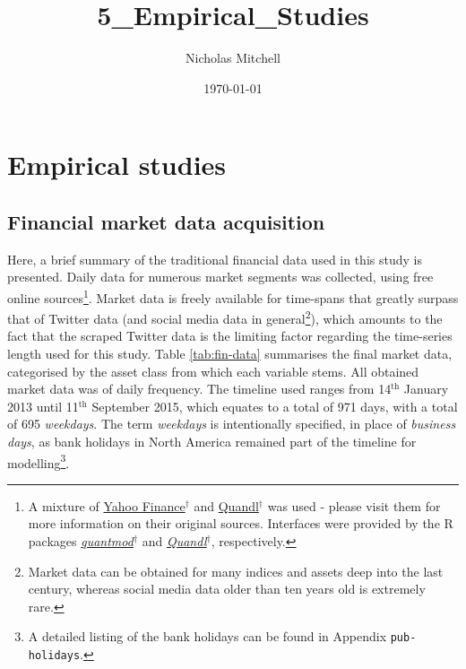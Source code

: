 \documentclass{article}
\author{Nicholas Mitchell}
\date{\today}
\title{5\_Empirical\_Studies}
\begin{document}
\maketitle
\tableofcontents

\pagebreak

\section{Empirical studies \label{chapter-empirical-studies}}
\label{sec-1}


\subsection{Financial market data acquisition}
\label{sec-1-1}

Here, a brief summary of the traditional financial data used in this study is presented. Daily data for numerous market segments was collected, using free online sources\footnote{A mixture of \href{http://finance.yahoo.com/}{Yahoo Finance$^{\dag{}}$} and \href{https://www.quandl.com/collections/markets}{Quandl$^{\dag{}}$} was used - please visit them for more information on their original sources. Interfaces were provided by the R packages \href{https://cran.r-project.org/web/packages/quantmod/index.html}{\emph{quantmod$^{\dag{}}$}} and \href{https://cran.r-project.org/web/packages/Quandl/index.html}{\emph{Quandl$^{\dag{}}$}}, respectively.}. Market data is freely available for time-spans that greatly surpass that of Twitter data (and social media data in general\footnote{Market data can be obtained for many indices and assets deep into the last century, whereas social media data older than ten years old is extremely rare.}), which amounts to the fact that the scraped Twitter data is the limiting factor regarding the time-series length used for this study. Table \ref{tab:fin-data} summarises the final market data, categorised by the asset class from which each variable stems. All obtained market data was of daily frequency. The timeline used ranges from 14$^{\text{th}}$ January 2013 until 11$^{\text{th}}$ September 2015, which equates to a total of 971 days, with a total of 695 \emph{weekdays}. The term \emph{weekdays} is intentionally specified, in place of \emph{business days}, as bank holidays in North America remained part of the timeline for modelling\footnote{A detailed listing of the bank holidays can be found in Appendix \texttt{pub-holidays}.}.
\end{document}
